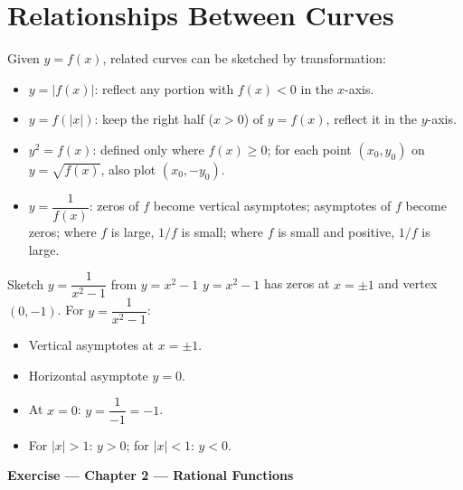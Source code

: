 \documentclass[12pt,a4paper]{article}
\theoremstyle{defstyle}
\newcounter{qnum}
\newcommand{\resetQ}{\setcounter{qnum}{0}}
\newcommand{\exsection}[1]{%
  \vspace{10pt}
  \begin{tcolorbox}[colback=gray!8, colframe=gray!50,
      left=6pt, right=6pt, top=4pt, bottom=4pt]
    {\bfseries\large Exercise --- #1}
  \end{tcolorbox}
  \vspace{4pt}
}
\begin{document}
\section{Relationships Between Curves}

Given \(y=f(x)\), related curves can be sketched by transformation:

\begin{result}{}{}
\begin{itemize}[nosep]
  \item \(y=|f(x)|\): reflect any portion with \(f(x)<0\) in the \(x\)-axis.
  \item \(y=f(|x|)\): keep the right half (\(x>0\)) of \(y=f(x)\), reflect it in the \(y\)-axis.
  \item \(y^2=f(x)\): defined only where \(f(x)\geq 0\); for each point \((x_0,y_0)\) on \(y=\sqrt{f(x)}\), also plot \((x_0,-y_0)\).
  \item \(y=\dfrac{1}{f(x)}\): zeros of \(f\) become vertical asymptotes; asymptotes of \(f\) become zeros; where \(f\) is large, \(1/f\) is small; where \(f\) is small and positive, \(1/f\) is large.
\end{itemize}
\end{result}

\begin{example}{Sketch $y=\dfrac{1}{x^2-1}$ from $y=x^2-1$}{}
\(y=x^2-1\) has zeros at \(x=\pm1\) and vertex \((0,-1)\).
For \(y=\dfrac{1}{x^2-1}\):
\begin{itemize}[nosep]
  \item Vertical asymptotes at \(x=\pm1\).
  \item Horizontal asymptote \(y=0\).
  \item At \(x=0\): \(y=\dfrac{1}{-1}=-1\).
  \item For \(|x|>1\): \(y>0\); for \(|x|<1\): \(y<0\).
\end{itemize}
\end{example}

\exsection{Chapter 2 --- Rational Functions}
\resetQ
\end{document}
